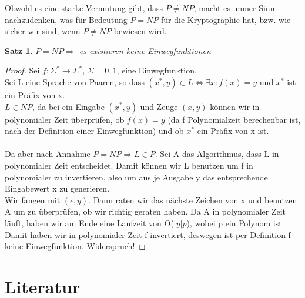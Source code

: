 \documentclass[12pt,a4paper]{article}
\newtheorem{theorem}{Satz}[section]
\theoremstyle{definition}
\begin{document}
    Obwohl es eine starke Vermutung gibt, dass $P \not = NP$, macht es immer Sinn nachzudenken, was für Bedeutung
    $P = NP$ für die Kryptographie hat, bzw. wie sicher wir sind, wenn $P \not = NP$ bewiesen wird.

    \begin{theorem}
        $P = NP \Rightarrow$ es existieren keine Einwegfunktionen
    \end{theorem}

    \begin{proof}
        Sei $f: \Sigma^* \longrightarrow \Sigma^*$, $\Sigma = {0, 1}$, eine Einwegfunktion. \\
        Sei L eine Sprache von Paaren, so dass $(x^*, y) \in L \Leftrightarrow \exists x: f(x) = y$ und $x^*$ ist ein
        Präfix von x. \\
        $L \in NP$, da bei ein Eingabe $(x^*, y)$ und Zeuge $(x, y)$ können wir in polynomialer Zeit überprüfen,
        ob $f(x) = y$ (da f Polynomialzeit berechenbar ist, nach der Definition einer Einwegfunktion) und ob $x^*$ ein
        Präfix von x ist. \\ \\

        Da aber nach Annahme $P = NP \Rightarrow L \in P$. Sei A das Algorithmus, dass L in polynomialer Zeit
        entscheidet. Damit können wir L benutzen um f in polynomialer
        zu invertieren, also um aus je Ausgabe y das entsprechende Eingabewert x zu generieren. \\
        Wir fangen mit $(\epsilon, y)$. Dann raten wir das nächste Zeichen von x und benutzen A um zu überprüfen,
        ob wir richtig geraten haben. Da A in polynomialer Zeit läuft, haben wir am Ende eine Laufzeit von O($|y|p$),
        wobei p ein Polynom ist. Damit haben wir in polynomialer Zeit f invertiert, deswegen ist per Definition
        f keine Einwegfunktion. Widerspruch!
    \end{proof}

    \section{Literatur}
\end{document}
